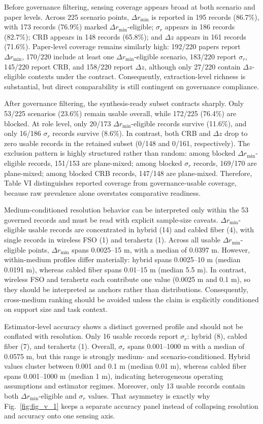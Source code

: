 Before governance filtering, sensing coverage appears broad at both scenario and paper levels. Across 225 scenario points, $\Delta r_{\min}$ is reported in 195 records (86.7\%), with 173 records (76.9\%) marked $\Delta r_{\min}$-eligible; $\sigma_r$ appears in 186 records (82.7\%); CRB appears in 148 records (65.8\%); and $\Delta z$ appears in 161 records (71.6\%). Paper-level coverage remains similarly high: 192/220 papers report $\Delta r_{\min}$, 170/220 include at least one $\Delta r_{\min}$-eligible scenario, 183/220 report $\sigma_r$, 145/220 report CRB, and 158/220 report $\Delta z$, although only 27/220 contain $\Delta z$-eligible contexts under the contract. Consequently, extraction-level richness is substantial, but direct comparability is still contingent on governance compliance.

After governance filtering, the synthesis-ready subset contracts sharply. Only 53/225 scenarios (23.6\%) remain usable overall, while 172/225 (76.4\%) are blocked. At role level, only 20/173 $\Delta r_{\min}$-eligible records survive (11.6\%), and only 16/186 $\sigma_r$ records survive (8.6\%). In contrast, both CRB and $\Delta z$ drop to zero usable records in the retained subset (0/148 and 0/161, respectively). The exclusion pattern is highly structured rather than random: among blocked $\Delta r_{\min}$-eligible records, 151/153 are plane-mixed; among blocked $\sigma_r$ records, 169/170 are plane-mixed; among blocked CRB records, 147/148 are plane-mixed. Therefore, Table VI distinguishes reported coverage from governance-usable coverage, because raw prevalence alone overstates comparative readiness.

Medium-conditioned resolution behavior can be interpreted only within the 53 governed records and must be read with explicit sample-size caveats. $\Delta r_{\min}$-eligible usable records are concentrated in hybrid (14) and cabled fiber (4), with single records in wireless FSO (1) and terahertz (1). Across all usable $\Delta r_{\min}$-eligible points, $\Delta r_{\min}$ spans 0.0025--15 m, with a median of 0.0397 m. However, within-medium profiles differ materially: hybrid spans 0.0025--10 m (median 0.0191 m), whereas cabled fiber spans 0.01--15 m (median 5.5 m). In contrast, wireless FSO and terahertz each contribute one value (0.0025 m and 0.1 m), so they should be interpreted as anchors rather than distributions. Consequently, cross-medium ranking should be avoided unless the claim is explicitly conditioned on support size and task context.

Estimator-level accuracy shows a distinct governed profile and should not be conflated with resolution. Only 16 usable records report $\sigma_r$: hybrid (8), cabled fiber (7), and terahertz (1). Overall, $\sigma_r$ spans 0.001--1000 m with a median of 0.0575 m, but this range is strongly medium- and scenario-conditioned. Hybrid values cluster between 0.001 and 0.1 m (median 0.01 m), whereas cabled fiber spans 0.001--1000 m (median 1 m), indicating heterogeneous operating assumptions and estimator regimes. Moreover, only 13 usable records contain both $\Delta r_{\min}$-eligible and $\sigma_r$ values. That asymmetry is exactly why Fig.~\ref{fig:fig_v_1} keeps a separate accuracy panel instead of collapsing resolution and accuracy onto one sensing axis.

